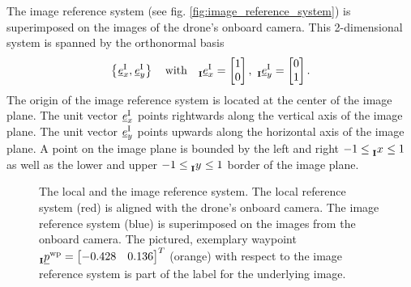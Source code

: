 The image reference system (see fig. \ref{fig:image_reference_system}) 
is superimposed on the images of the drone's onboard camera.
This 2-dimensional system is spanned by the orthonormal basis
\begin{equation}
    \left\{
        \unitvec[]{\text I}{x}{}{},
        \unitvec[]{\text I}{y}{}{}
    \right\}
    \quad \text{with} \quad 
    \unitvec[]{\text I}{x}{\irs}{} = \begin{bmatrix} 1 \\ 0 \end{bmatrix},\ 
    \unitvec[]{\text I}{y}{\irs}{} = \begin{bmatrix} 0 \\ 1 \end{bmatrix}.
\end{equation}
The origin of the image reference system 
is located at the center of the image plane.
The unit vector 
$\unitvec[]{\text I}{x}{}{}$  
points rightwards along the vertical axis of the image plane.
The unit vector 
$\unitvec[]{\text I}{y}{}{}$  
points upwards along the horizontal axis of the image plane.
A point on the image plane 
is bounded by the left and right
$ -1 \le \x[]{}{}{\irs}{} \le 1 $
as well as the lower and upper
$ -1 \le \y[]{}{}{\irs}{} \le 1 $
border of the image plane.
\begin{figure}[h]
    \centering
    \caption[
        Local and image reference system
    ]{
        The local and the image reference system. 
        The local reference system (red) is aligned with the drone's onboard camera. 
        The image reference system (blue) is superimposed on the images from the onboard camera.
        The pictured, exemplary waypoint
        $\pos[]{\wayp}{}{\irs}{} = \begin{bmatrix} -0.428 & 0.136 \end{bmatrix}^T$
        (orange) with respect to the image reference system
        is part of the label for the underlying image.
        \label{fig:local_and_image_reference_system}
    }
\end{figure}





